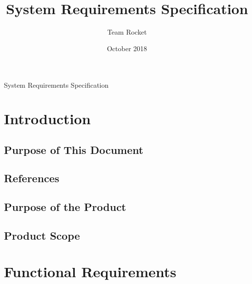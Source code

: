 \documentclass{article}
\title{System Requirements Specification}
\author{Team Rocket}
\date{October 2018}
\begin{document}
\maketitle


\begin{center}
    System Requirements Specification
\end{center}

\tableofcontents

\newpage

\section{Introduction}
\subsection{Purpose of This Document}
\subsection{References}
\subsection{Purpose of the Product}
\subsection{Product Scope}

\section{Functional Requirements}
\end{document}
